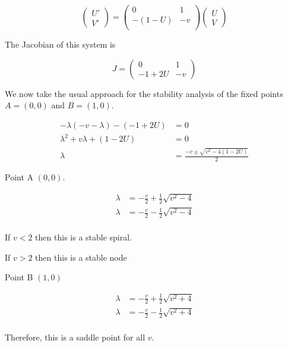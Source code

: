 \documentclass[11pt, a4paper]{article}
\begin{document}
\begin{equation}
\begin{pmatrix}
U' \\
V'
\end{pmatrix}
= 
\begin{pmatrix}
0 & 1 \\
-(1-U) & -v \\
\end{pmatrix}
\begin{pmatrix}
U \\
V
\end{pmatrix}
\end{equation}

The Jacobian of this system is 

\begin{equation}
J = 
\begin{pmatrix}
0 & 1 \\
-1 + 2U & -v
\end{pmatrix}
\end{equation}

We now take the usual approach for the stability analysis of the fixed points $A = (0,0)$ and $B = (1,0)$. 

\begin{align*}
-\lambda (-v - \lambda ) - (-1 + 2U) & = 0 \\
\lambda ^2 + v \lambda + (1- 2U) & = 0 \\
\lambda & = \frac{-v \pm \sqrt{v^2 - 4 (1-2U) }}{2}
\end{align*}

Point A $(0,0)$.

\begin{align*}
\lambda & = -\frac{v}{2} + \frac{1}{2} \sqrt{v^2 - 4} \\
\lambda & = -\frac{v}{2} - \frac{1}{2} \sqrt{v^2 - 4} \\
\end{align*}

If $v < 2$ then this is a stable spiral. 

If $v > 2$ then this is a stable node 

Point B $(1,0)$

\begin{align*}
\lambda & = -\frac{v}{2} + \frac{1}{2} \sqrt{v^2 + 4} \\
\lambda & = -\frac{v}{2} - \frac{1}{2} \sqrt{v^2 + 4} \\
\end{align*}

Therefore, this is a saddle point for all $v$. 
\end{document}
